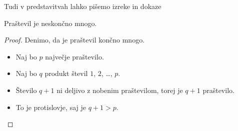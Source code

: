 \begin{frame}{Tudi v predstavitvah lahko pišemo izreke in dokaze}

	\begin{izrek}
	   Praštevil je neskončno mnogo.
	\end{izrek}
	\begin{proof}
	   Denimo, da je praštevil končno mnogo.
	   \begin{itemize}[<+->]
		  \item Naj bo $p$ \alert<4>{največje} praštevilo.
		  \item Naj bo $q$ produkt števil $1$, $2$, \ldots, $p$.
		  \item Število $q+1$ ni deljivo z nobenim praštevilom, torej je $q+1$ praštevilo.
		  \item To je protislovje, saj je $q+1>p$. \qedhere
	   \end{itemize}
	\end{proof}
 \end{frame}
 